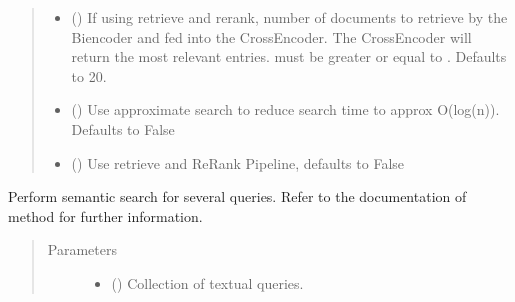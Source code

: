 \documentclass[letterpaper,10pt,english]{sphinxmanual}
\begin{document}
\begin{fulllineitems}
\begin{fulllineitems}
\begin{quote}
\begin{description}
\begin{itemize}
\item {} 
 (\sphinxstyleliteralemphasis{\sphinxupquote{, }}) \textendash{} If using retrieve and re\sphinxhyphen{}rank, number of documents to
retrieve by the Bi\sphinxhyphen{}encoder and fed into the Cross\sphinxhyphen{}Encoder. The Cross\sphinxhyphen{}Encoder will
return the  most relevant entries.  must be greater or equal to
. Defaults to 20.

\item {} 
 (\sphinxstyleliteralemphasis{\sphinxupquote{, }}) \textendash{} Use approximate search to reduce search time to approx O(log(n)).
Defaults to False

\item {} 
 (\sphinxstyleliteralemphasis{\sphinxupquote{, }}) \textendash{} Use retrieve and Re\sphinxhyphen{}Rank Pipeline, defaults to False

\end{itemize}

\end{description}\end{quote}

\end{fulllineitems}


\begin{fulllineitems}
\label{\detokenize{code:semantic_search.SemanticSearch.search_multiple}}
Perform semantic search for several queries. Refer to the documentation
of  method for further information.
\begin{quote}\begin{description}
\item[{Parameters}] \leavevmode\begin{itemize}
\item {} 
 () \textendash{} Collection of textual queries.


\end{itemize}
\end{description}
\end{quote}
\end{fulllineitems}
\end{fulllineitems}
\end{document}
